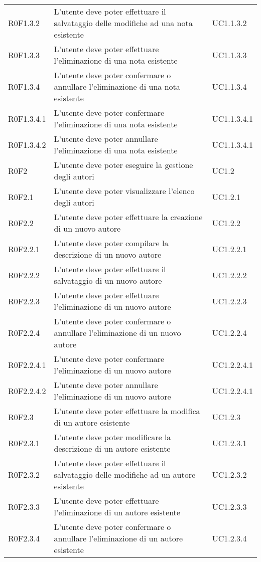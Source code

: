 \begin{longtable}{lp{}l}
R0F1.3.2
& L'utente deve poter effettuare il salvataggio delle modifiche ad una nota esistente
& UC1.1.3.2 \\
R0F1.3.3
& L'utente deve poter effettuare l'eliminazione di una nota esistente
& UC1.1.3.3 \\
R0F1.3.4
& L'utente deve poter confermare o annullare l'eliminazione di una nota esistente
& UC1.1.3.4 \\
R0F1.3.4.1
& L'utente deve poter confermare l'eliminazione di una nota esistente
& UC1.1.3.4.1 \\
R0F1.3.4.2
& L'utente deve poter annullare l'eliminazione di una nota esistente
& UC1.1.3.4.1 \\
R0F2
& L'utente deve poter eseguire la gestione degli autori
& UC1.2 \\
R0F2.1
& L'utente deve poter visualizzare l'elenco degli autori
& UC1.2.1 \\
R0F2.2
& L'utente deve poter effettuare la creazione di un nuovo autore
& UC1.2.2 \\
R0F2.2.1
& L'utente deve poter compilare la descrizione di un nuovo autore
& UC1.2.2.1 \\
R0F2.2.2
& L'utente deve poter effettuare il salvataggio di un nuovo autore
& UC1.2.2.2 \\
R0F2.2.3
& L'utente deve poter effettuare l'eliminazione di un nuovo autore
& UC1.2.2.3 \\
R0F2.2.4
& L'utente deve poter confermare o annullare l'eliminazione di un nuovo autore
& UC1.2.2.4 \\
R0F2.2.4.1
& L'utente deve poter confermare l'eliminazione di un nuovo autore
& UC1.2.2.4.1 \\
R0F2.2.4.2
& L'utente deve poter annullare l'eliminazione di un nuovo autore
& UC1.2.2.4.1 \\
R0F2.3
& L'utente deve poter effettuare la modifica di un autore esistente
& UC1.2.3 \\
R0F2.3.1
& L'utente deve poter modificare la descrizione di un autore esistente
& UC1.2.3.1 \\
R0F2.3.2
& L'utente deve poter effettuare il salvataggio delle modifiche ad un autore esistente
& UC1.2.3.2 \\
R0F2.3.3
& L'utente deve poter effettuare l'eliminazione di un autore esistente
& UC1.2.3.3 \\
R0F2.3.4
& L'utente deve poter confermare o annullare l'eliminazione di un autore esistente
& UC1.2.3.4 \\

\end{longtable}
